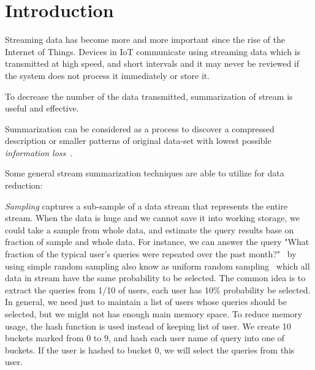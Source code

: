 \section{Introduction}

Streaming data has become more and more important since the rise of the Internet
of Things. Devices in IoT communicate using streaming data which is transmitted
at high speed, and short intervals and it may never be reviewed if the system
does not process it immediately or store it. 


To decrease the number of the data transmitted, summarization of stream is
useful and effective.  

Summarization can be considered as a process to discover a compressed
description or smaller patterns of original data-set with lowest possible
\emph{information loss}~\cite{chandola2007summarization}. 

Some general stream summarization techniques are able to utilize for data
reduction:

\emph{Sampling} captures a sub-sample of a data stream that represents the
entire stream. When the data is huge and we cannot save it into working storage,
we could take a sample from whole data, and estimate the query results base on
fraction of sample and whole data.  For instance, we can answer the query "What
fraction of the typical user's queries were repeated over the past month?"~\cite{leskovec2014mining} by
using simple random sampling also know as uniform random
sampling~\cite{vitter1984faster, Ahrens1985SequentialRS} which all data in
stream have the same probability to be selected. The common idea is to extract
the queries from 1/10 of users, each user has 10\% probability be selected. In
general, we need just to maintain a list of users whose queries should be
selected, but we might not has enough main memory space. To reduce memory usage,
the hash function is used instead of keeping list of user. We create 10 buckets
marked from 0 to 9, and hash each user name of query into one of buckets. If the
user is hashed to bucket 0, we will select the queries from this user.

